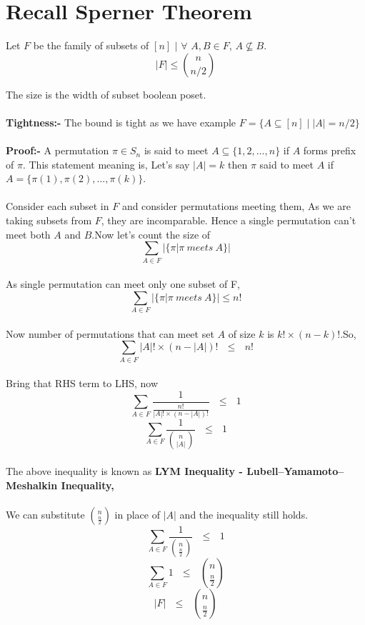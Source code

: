 
\section{Recall Sperner Theorem}
Let $F$ be the family of subsets of $[n]$ $|$ $\forall$ $A,B \in F$, $A \nsubseteq B$.
$$|F| \le {n\choose{n/2}}$$

The size is the width of subset boolean poset.\\\\
\textbf{Tightness:-} The bound is tight as we have example $F=\{A\subseteq [n] \mid \left |A\right |=n/2\}$\\\\
\textbf{Proof:-} 
A permutation $\pi \in S_n$ is said to meet $A \subseteq \{1,2,\ldots,n\}$ if $A$ forms prefix of $\pi$. This statement meaning is, Let's say $|A| = k$ then $\pi$ said to meet $A$ if $A = \{\pi(1),\pi(2),\ldots,\pi(k)\}$.\\\\
Consider each subset in $F$ and consider permutations meeting them, As we are taking subsets from $F$, they are incomparable. Hence a single permutation can't meet both $A$ and $B$.Now let's count the size of
$$\sum_{A\in F} \bigg|\{\pi | \pi ~meets~ A\}\bigg|$$\\
As single permutation can meet only one subset of F,
$$\sum_{A\in F} \bigg|\{\pi | \pi ~meets~ A\}\bigg| \leq n!$$\\
Now number of permutations that can meet set $A$ of size $k$ is $k! \times (n-k)!$.So,
$$\sum_{A\in F} |A|! \times (n-|A|)! ~~~\leq~~~ n!$$\\
Bring that RHS term to LHS, now 
$$\sum_{A\in F} \frac{1}{\frac{n!}{|A|! \times (n-|A|)!}} ~~~\leq~~~ 1$$
$$\boxed{\sum_{A\in F} \frac{1}{{n \choose {|A|}}} ~~~ \leq ~~~ 1}$$\\
The above inequality is known as \textbf{LYM Inequality -  Lubell–Yamamoto–Meshalkin Inequality,}\\\\
We can substitute $n \choose \frac{n}{2}$ in place of $|A|$ and the inequality still holds.
$$\sum_{A\in F} \frac{1}{{n \choose \frac{n}{2}}} ~~~ \leq ~~~ 1$$
$$\sum_{A\in F} 1  ~~~ \leq ~~~ {n \choose \frac{n}{2}}$$
$$|F| ~~~\leq~~~ {n \choose \frac{n}{2}}$$\\

